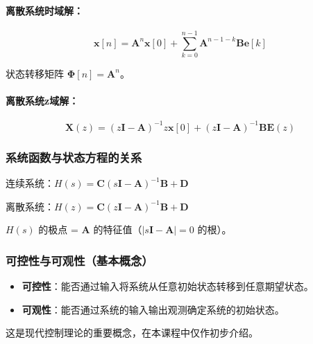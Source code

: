 \documentclass[11pt,a4paper]{ctexart}
\begin{document}
\paragraph{离散系统时域解：}
\[
\boxed{\mathbf{x}[n] = \mathbf{A}^n\mathbf{x}[0] + \sum_{k=0}^{n-1} \mathbf{A}^{n-1-k}\mathbf{B}\mathbf{e}[k]}
\]

状态转移矩阵 $\boldsymbol{\Phi}[n] = \mathbf{A}^n$。

\paragraph{离散系统z域解：}
\[
\boxed{\mathbf{X}(z) = (z\mathbf{I} - \mathbf{A})^{-1}z\mathbf{x}[0] + (z\mathbf{I} - \mathbf{A})^{-1}\mathbf{B}\mathbf{E}(z)}
\]

\subsubsection{系统函数与状态方程的关系}

连续系统：$H(s) = \mathbf{C}(s\mathbf{I} - \mathbf{A})^{-1}\mathbf{B} + \mathbf{D}$

离散系统：$H(z) = \mathbf{C}(z\mathbf{I} - \mathbf{A})^{-1}\mathbf{B} + \mathbf{D}$

$H(s)$ 的极点 = $\mathbf{A}$ 的特征值（$|s\mathbf{I} - \mathbf{A}| = 0$ 的根）。

\subsubsection{可控性与可观性（基本概念）}

\begin{itemize}
    \item \textbf{可控性}：能否通过输入将系统从任意初始状态转移到任意期望状态。
    \item \textbf{可观性}：能否通过系统的输入输出观测确定系统的初始状态。
\end{itemize}

这是现代控制理论的重要概念，在本课程中仅作初步介绍。
\end{document}
